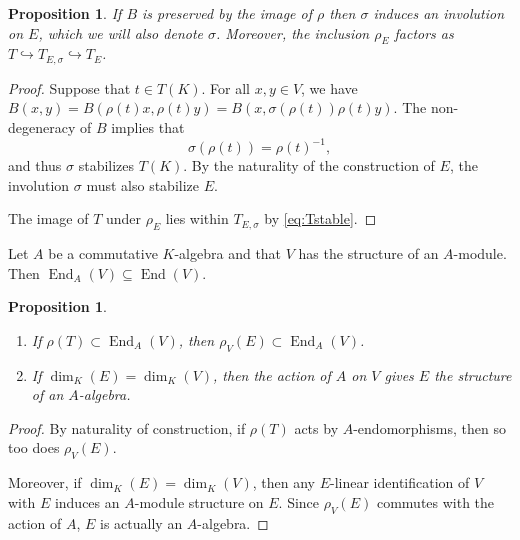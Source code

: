 \documentclass{article}
\theoremstyle{plain}
\newtheorem{proposition}[theorem]{Proposition}
\theoremstyle{definition}
\newtheorem{remark}[theorem]{Remark}
\numberwithin{equation}{section}
\DeclareMathOperator{\End}{End}
\begin{document}
\begin{proposition}
If $B$ is preserved by the image of $\rho$ then $\sigma$ induces an involution on $E$, which we will also denote $\sigma$.
Moreover, the inclusion $\rho_E$ factors as $T \hookrightarrow T_{E, \sigma} \hookrightarrow T_E$.
\end{proposition}
\begin{proof}
Suppose that $t \in T(K)$.  For all $x, y \in V$, we have $B(x,y) = B(\rho(t)x,\rho(t)y) = B(x,\sigma(\rho(t))\rho(t)y)$.  The non-degeneracy of $B$ implies that
\begin{equation} \label{eq:Tstable}
\sigma(\rho(t)) = \rho(t)^{-1},
\end{equation}
and thus $\sigma$ stabilizes $T(K)$.  By the naturality of the construction of $E$, the involution $\sigma$ must also stabilize $E$.

The image of $T$ under $\rho_E$ lies within $T_{E,\sigma}$ by \eqref{eq:Tstable}.
\end{proof}

Let $A$ be a commutative $K$-algebra and that $V$ has the structure of an $A$-module.  Then $\End_A(V) \subseteq \End(V)$.

\begin{proposition}

\begin{enumerate}
\item If $\rho(T) \subset \End_A(V)$, then $\rho_V(E) \subset \End_A(V)$.
\item If $\dim_K(E) = \dim_K(V)$, then the action of $A$ on $V$ gives $E$ the structure of an $A$-algebra.
\end{enumerate}
\end{proposition}
\begin{proof}
By naturality of construction, if $\rho(T)$ acts by $A$-endomorphisms, then so too does $\rho_V(E)$.

Moreover, if $\dim_K(E) = \dim_K(V)$, then any $E$-linear identification of $V$ with $E$ induces an $A$-module structure on $E$.  Since $\rho_V(E)$ commutes with the action of $A$, $E$ is actually an $A$-algebra.
\end{proof}
\end{document}

